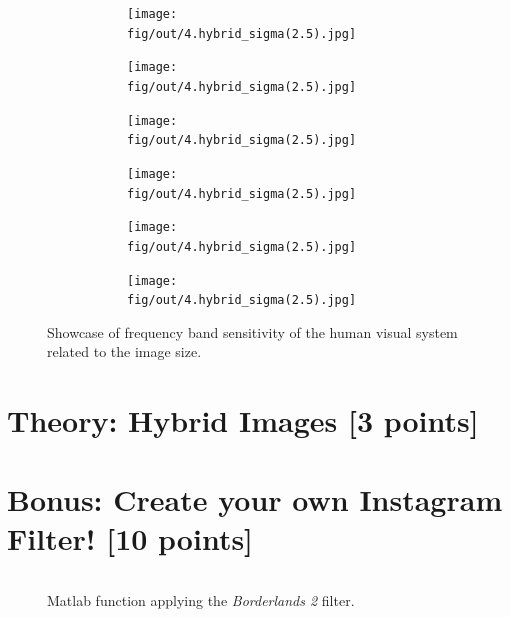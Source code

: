 \documentclass[tikz,14pt,fleqn]{article}
\begin{document}
\begin{figure}[h!]
    \centering
    \begin{subfigure}[]{.8\linewidth}
        \begin{subfigure}[]{.25\linewidth}
            \texttt{[image: fig/out/4.hybrid\_sigma(2.5).jpg]}
        \end{subfigure}
        \begin{subfigure}[]{.2\linewidth}
            \texttt{[image: fig/out/4.hybrid\_sigma(2.5).jpg]}
        \end{subfigure}
        \begin{subfigure}[]{.16\linewidth}
            \texttt{[image: fig/out/4.hybrid\_sigma(2.5).jpg]}
        \end{subfigure}
        \begin{subfigure}[]{.128\linewidth}
            \texttt{[image: fig/out/4.hybrid\_sigma(2.5).jpg]}
        \end{subfigure}
        \begin{subfigure}[]{.1024\linewidth}
            \texttt{[image: fig/out/4.hybrid\_sigma(2.5).jpg]}
        \end{subfigure}
        \begin{subfigure}[]{.08192\linewidth}
            \texttt{[image: fig/out/4.hybrid\_sigma(2.5).jpg]}
        \end{subfigure}
    \end{subfigure}
    \caption{Showcase of frequency band sensitivity of the human visual system related to the image size.}
    \label{fig:4.showcase}
\end{figure}
\section{Theory: Hybrid Images [3 points]}


\section{Bonus: Create your own Instagram Filter! [10 points]}


\begin{figure}[h!]
    \vspace*{-0.2cm}
    \inputminted[firstline=15, frame=lines, framesep=2mm, fontsize=\small ]{matlab}{../src/ex6.m}
    \vspace*{-0.5cm}
    \caption{Matlab function applying the \textit{Borderlands 2} filter.}
\end{figure}
\end{document}
